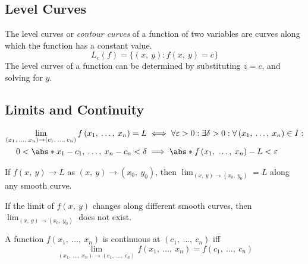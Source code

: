 \documentclass{article}
\begin{document}
\subsection{Level Curves}
\begin{definition}
    The level curves or \textit{contour curves} of a function of two
    variables are curves along which the function has a constant value.
    \begin{equation*}
        L_c\left( f \right) = \bigl\{ \left( x,\: y \right) : f\left(x,\: y\right) = c\bigr\}
    \end{equation*}
    The level curves of a function can be determined by substituting
    \(z = c\), and solving for \(y\).
\end{definition}
\subsection{Limits and Continuity}
\begin{definition}
    \begin{align*}
        \lim_{\left( x_1,\: \ldots,\: x_n \right)\to \left( c_1,\: \ldots,\: c_n \right)} f\left( x_1,\: \ldots,\: x_n \right) = L
                                                    & \iff\forall\varepsilon>0: \exists\delta>0: \forall \left( x_1,\: \ldots,\: x_n \right) \in I: \\
        0<\abs*{x_1-c_1,\: \ldots,\: x_n-c_n}<\delta & \implies \abs*{f\left( x_1,\: \ldots,\: x_n \right)-L}<\varepsilon
    \end{align*}
\end{definition}
\begin{theorem}
    If \(f\left( x,\: y \right) \to L\) as \(\left( x,\: y \right) \to \left( x_0,\: y_0 \right)\), then
    \(\displaystyle \lim_{\left( x,\: y \right) \to \left( x_0,\: y_0 \right)} = L\) along any
    smooth curve.
\end{theorem}
\begin{theorem}
    If the limit of \(f\left( x,\: y \right)\) changes along different smooth curves,
    then \(\displaystyle \lim_{\left( x,\: y \right) \to \left( x_0,\: y_0 \right)}\) does not
    exist.
\end{theorem}
\begin{theorem}
    A function \(f\left( x_1,\: \ldots,\: x_n \right)\) is continuous at
    \(\left( c_1,\: \ldots,\: c_n \right)\) iff
    \begin{equation*}
        \lim_{\left( x_1,\: \ldots,\: x_n \right)\to \left( c_1,\: \ldots,\: c_n \right)} f\left( x_1,\: \ldots,\: x_n \right) = f\left( c_1,\: \ldots,\: c_n \right)
    \end{equation*}
\end{theorem}
\end{document}
